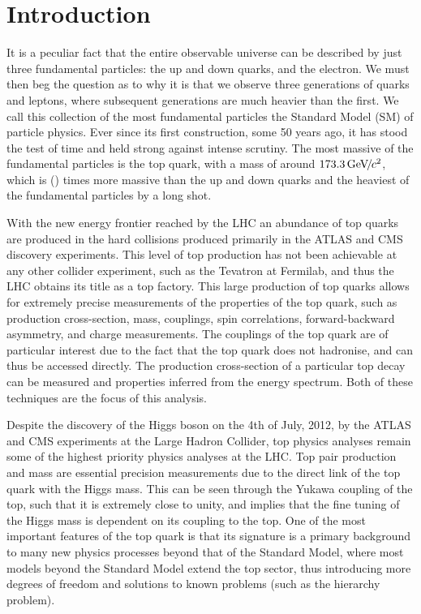 \chapter*{Introduction}\label{chap-introduction}

It is a peculiar fact that the entire observable universe can be described by just three fundamental particles: the up and down quarks, and the electron. We must then beg the question as to why it is that we observe three generations of quarks and leptons, where subsequent generations are much heavier than the first. We call this collection of the most fundamental particles the Standard Model (SM) of particle physics. Ever since its first construction, some 50 years ago, it has stood the test of time and held strong against intense scrutiny. The most massive of the fundamental particles is the top quark, with a mass of around $173.3 {\,\text{Ge\hspace{-.08em}V\hspace{-0.16em}/\hspace{-0.08em}}c^\text{2}}$, which is () times more massive than the up and down quarks and the heaviest of the fundamental particles by a long shot. 

With the new energy frontier reached by the LHC an abundance of top quarks are produced in the hard collisions produced primarily in the ATLAS and CMS discovery experiments. This level of top production has not been achievable at any other collider experiment, such as the Tevatron at Fermilab, and thus the LHC obtains its title as a top factory. This large production of top quarks allows for extremely precise measurements of the properties of the top quark, such as production cross-section, mass, couplings, spin correlations, forward-backward asymmetry, and charge measurements. The couplings of the top quark are of particular interest due to the fact that the top quark does not hadronise, and can thus be accessed directly. The production cross-section of a particular top decay can be measured and properties inferred from the energy spectrum. Both of these techniques are the focus of this analysis. 

Despite the discovery of the Higgs boson on the 4th of July, 2012, by the ATLAS and CMS experiments \cite{ATLASHiggs, CMSHiggs} at the Large Hadron Collider, top physics analyses remain some of the highest priority physics analyses at the LHC. Top pair production and mass are essential precision measurements due to the direct link of the top quark with the Higgs mass. This can be seen through the Yukawa coupling of the top, such that it is extremely close to unity, and implies that the fine tuning of the Higgs mass is dependent on its coupling to the top. One of the most important features of the top quark is that its signature is a primary background to many new physics processes beyond that of the Standard Model, where most models beyond the Standard Model extend the top sector, thus introducing more degrees of freedom and solutions to known problems (such as the hierarchy problem).

